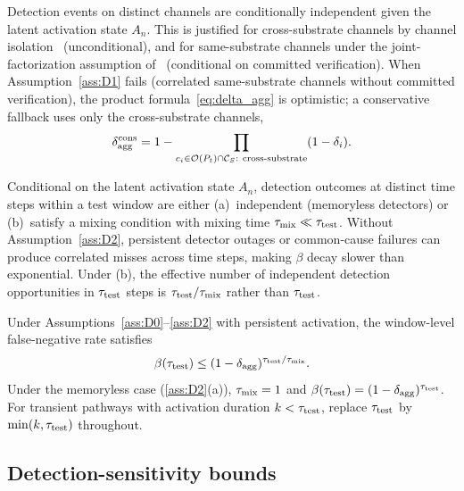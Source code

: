 \begin{assumption}
\label{ass:D1}
Detection events on distinct channels are conditionally
independent given the latent activation state $A_n$.  This is
justified for cross-substrate channels by channel
isolation~\citep[Proposition~5]{lasser2026exo} (unconditional),
and for same-substrate channels under the joint-factorization
assumption of~\citep[Proposition~6]{lasser2026exo} (conditional
on committed verification).  When
Assumption~\ref{ass:D1} fails (correlated same-substrate
channels without committed verification), the product
formula~\eqref{eq:delta_agg} is optimistic; a conservative
fallback uses only the cross-substrate channels,
\begin{equation}
\label{eq:delta_agg_conservative}
\delta_{\mathrm{agg}}^{\mathrm{cons}}
  = 1 - \prod_{c_i \in \mathcal{O}(P_t) \cap \mathcal{C}_{S}
              :\ \mathrm{cross\text{-}substrate}} (1 - \delta_i).
\end{equation}
\end{assumption}

\begin{assumption}
\label{ass:D2}
Conditional on the latent activation state $A_n$, detection
outcomes at distinct time steps within a test window are either
(a)~independent (memoryless detectors) or (b)~satisfy a mixing
condition with mixing time
$\tau_{\mathrm{mix}} \ll \tau_{\mathrm{test}}$.  Without Assumption~\ref{ass:D2},
persistent detector outages or common-cause failures can produce
correlated misses across time steps, making $\beta$ decay slower
than exponential.  Under (b), the effective number of
independent detection opportunities in $\tau_{\mathrm{test}}$ steps is
$\tau_{\mathrm{test}} / \tau_{\mathrm{mix}}$ rather than $\tau_{\mathrm{test}}$.
\end{assumption}

Under Assumptions~\ref{ass:D0}--\ref{ass:D2} with persistent
activation, the window-level false-negative rate satisfies
\begin{equation}
\label{eq:beta_window}
\beta(\tau_{\mathrm{test}}) \leq (1 - \delta_{\mathrm{agg}})^{\tau_{\mathrm{test}} / \tau_{\mathrm{mix}}}.
\end{equation}
Under the memoryless case (\ref{ass:D2}(a)), $\tau_{\mathrm{mix}} = 1$ and
$\beta(\tau_{\mathrm{test}}) = (1 - \delta_{\mathrm{agg}})^{\tau_{\mathrm{test}}}$.  For transient
pathways with activation duration $k < \tau_{\mathrm{test}}$, replace
$\tau_{\mathrm{test}}$ by $\min(k, \tau_{\mathrm{test}})$ throughout.

\subsection{Detection-sensitivity bounds}

